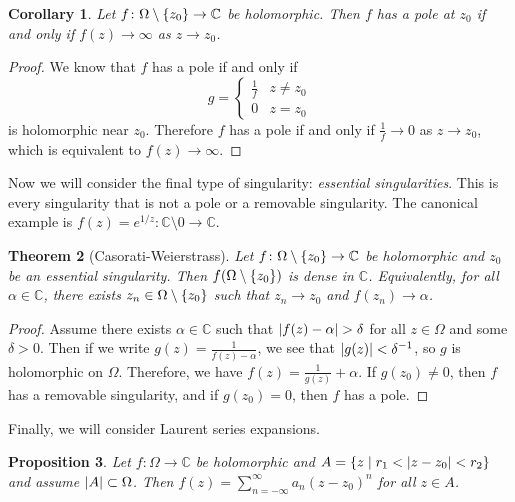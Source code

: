 \documentclass[leqno, openany]{memoir}
\newtheorem{thm}{Theorem}[section]
\newtheorem{cor}[thm]{Corollary}
\newtheorem{prop}[thm]{Proposition}
\theoremstyle{definition}
\theoremstyle{remark}
\theoremstyle{plain}
\theoremstyle{definition}
\theoremstyle{remark}
\newcommand{\C}{\mathbb{C}}
\begin{document}
\begin{cor} Let $f \colon \Omega \setminus \qty{z_0} \to \C$ be holomorphic.
Then $f$ has a pole at $z_0$ if and only if $f(z) \to \infty$ as $z \to z_0$.
\end{cor}

\begin{proof} We know that $f$ has a pole if and only if \[ g = \begin{cases}
\frac{1}{f} & z \neq z_0 \\ 0 & z = z_0 \end{cases} \] is holomorphic near
$z_0$. Therefore $f$ has a pole if and only if $\frac{1}{f} \to 0$ as $z \to
z_0$, which is equivalent to $f(z) \to \infty$.  \end{proof}

Now we will consider the final type of singularity: \textit{essential
singularities}. This is every singularity that is not a pole or a removable
singularity. The canonical example is $f(z) = e^{1/z} \colon \C \setminus
\qty{0} \to \C$.

\begin{thm}[Casorati-Weierstrass] Let $f \colon \Omega \setminus \qty{z_0} \to
    \C$ be holomorphic and $z_0$ be an essential singularity. Then $f(\Omega
    \setminus \qty{z_0})$ is dense in $\C$. Equivalently, for all $\alpha \in
    \C$, there exists $z_n \in \Omega \setminus \qty{z_0}$ such that $z_n \to
    z_0$ and $f(z_n) \to \alpha$.  \end{thm}

\begin{proof} Assume there exists $\alpha \in \C$ such that $\abs{f(z) -
    \alpha} > \delta$ for all $z \in \Omega$ and some $\delta > 0$. Then if we
    write $g(z) = \frac{1}{f(z) - \alpha}$, we see that $\abs{g(z)} <
    \delta^{-1}$, so $g$ is holomorphic on $\Omega$. Therefore, we have $f(z) =
    \frac{1}{g(z)} + \alpha$. If $g(z_0) \neq 0$, then $f$ has a removable
    singularity, and if $g(z_0) = 0$, then $f$ has a pole.  \end{proof}

Finally, we will consider Laurent series expansions.

\begin{prop} Let $f \colon \Omega \to \C$ be holomorphic and $A = \qty{z \mid
r_1 < \abs{z-z_0} < r_2}$ and assume $\abs{A} \subset \Omega$. Then $f(z) =
\sum_{n = -\infty}^{\infty} a_n {(z-z_0)}^n$ for all $z \in A$.  \end{prop}
\end{document}
